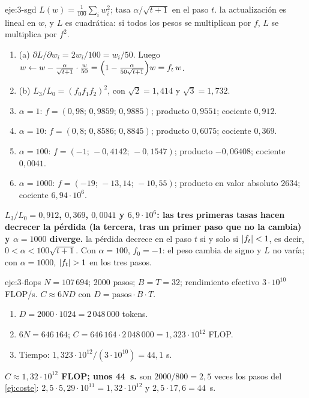 \begin{solucion}{eje:3-sgd}
\datos $L(w)=\frac1{100}\sum_i w_i^{2}$; tasa $\alpha/\sqrt{t+1}$ en el paso $t$.
\planteamiento la actualización es lineal en $w$, y $L$ es cuadrática: si todos los pesos se multiplican por $f$, $L$ se multiplica por $f^{2}$.
\pasos
\begin{enumerate}[label=\arabic*.]
  \item (a) $\partial L/\partial w_i=2w_i/100=w_i/50$. Luego $w\leftarrow w-\frac{\alpha}{\sqrt{t+1}}\cdot\frac{w}{50}=\Bigl(1-\frac{\alpha}{50\sqrt{t+1}}\Bigr)w=f_t\,w$.
  \item (b) $L_3/L_0=(f_0f_1f_2)^{2}$, con $\sqrt2=1{,}414$ y $\sqrt3=1{,}732$.
  \item $\alpha=1$: $f=(0{,}98;\allowbreak\,0{,}9859;\allowbreak\,0{,}9885)$; producto $0{,}9551$; cociente $0{,}912$.
  \item $\alpha=10$: $f=(0{,}8;\allowbreak\,0{,}8586;\allowbreak\,0{,}8845)$; producto $0{,}6075$; cociente $0{,}369$.
  \item $\alpha=100$: $f=(-1;\allowbreak\,-0{,}4142;\allowbreak\,-0{,}1547)$; producto $-0{,}06408$; cociente $0{,}0041$.
  \item $\alpha=1000$: $f=(-19;\allowbreak\,-13{,}14;\allowbreak\,-10{,}55)$; producto en valor absoluto $2634$; cociente $6{,}94\cdot 10^{6}$.
\end{enumerate}
\resultado \textbf{$L_3/L_0=0{,}912$, $0{,}369$, $0{,}0041$ y $6{,}9\cdot 10^{6}$: las tres primeras tasas hacen decrecer la pérdida (la tercera, tras un primer paso que no la cambia) y $\alpha=1000$ diverge.}
\comprobacion la pérdida decrece en el paso $t$ si y solo si $\lvert f_t\rvert<1$, es decir, $0<\alpha<100\sqrt{t+1}$. Con $\alpha=100$, $f_0=-1$: el peso cambia de signo y $L$ no varía; con $\alpha=1000$, $\lvert f_t\rvert>1$ en los tres pasos.
\end{solucion}

\begin{solucion}{eje:3-flops}
\datos $N=107\,694$; 2000 pasos; $B=T=32$; rendimiento efectivo $3\cdot 10^{10}$ FLOP/s.
\planteamiento $C\approx 6ND$ con $D=\text{pasos}\cdot B\cdot T$.
\pasos
\begin{enumerate}[label=\arabic*.]
  \item $D=2000\cdot 1024=2\,048\,000$ tokens.
  \item $6N=646\,164$; $C=646\,164\cdot 2\,048\,000=1{,}323\cdot 10^{12}$ FLOP.
  \item Tiempo: $1{,}323\cdot 10^{12}/(3\cdot 10^{10})=44{,}1$ s.
\end{enumerate}
\resultado \textbf{$C\approx 1{,}32\cdot 10^{12}$ FLOP; unos 44~s.}
\comprobacion son $2000/800=2{,}5$ veces los pasos del \cref{ej:coste}: $2{,}5\cdot 5{,}29\cdot 10^{11}=1{,}32\cdot 10^{12}$ y $2{,}5\cdot 17{,}6=44$~s.
\end{solucion}

